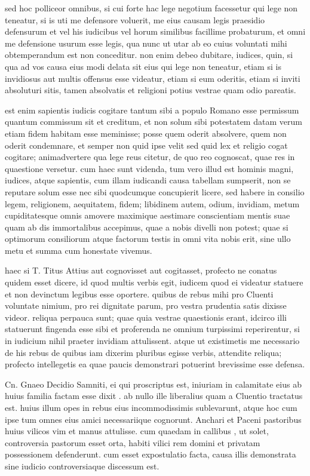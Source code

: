  sed hoc polliceor omnibus, si cui forte hac lege negotium facessetur qui lege non teneatur, si is uti me defensore voluerit, me eius causam legis praesidio defensurum et vel his iudicibus vel horum similibus facillime probaturum, et omni me defensione usurum esse legis, qua nunc ut utar ab eo cuius voluntati mihi obtemperandum est non conceditur. non enim debeo dubitare, iudices, quin, si qua ad vos causa eius modi delata sit eius qui lege non teneatur, etiam si is invidiosus aut multis offensus esse videatur, etiam si eum oderitis, etiam si inviti absoluturi sitis, tamen absolvatis et religioni potius vestrae quam odio pareatis.

 est enim sapientis iudicis cogitare tantum sibi a populo Romano esse permissum quantum commissum sit et creditum, et non solum sibi potestatem datam verum etiam fidem habitam esse meminisse; posse quem oderit absolvere, quem non oderit condemnare, et semper non quid ipse velit sed quid lex et religio cogat cogitare; animadvertere qua lege reus citetur, de quo reo cognoscat, quae res in quaestione versetur. cum haec sunt videnda, tum vero illud est hominis magni, iudices, atque sapientis, cum illam iudicandi causa tabellam sumpserit, non se reputare solum esse nec sibi quodcumque concupierit licere, sed habere in consilio legem, religionem, aequitatem, fidem; libidinem autem, odium, invidiam, metum cupiditatesque omnis amovere maximique aestimare conscientiam mentis suae quam ab dis immortalibus accepimus, quae a nobis divelli non potest; quae si optimorum consiliorum atque factorum testis in omni vita nobis erit, sine ullo metu et summa cum honestate vivemus.

 haec si T. Titus Attius aut cognovisset aut cogitasset, profecto ne conatus quidem esset dicere, id quod multis verbis egit, iudicem quod ei videatur statuere et non devinctum legibus esse oportere. quibus de rebus mihi pro Cluenti voluntate nimium, pro rei dignitate parum, pro vestra prudentia satis dixisse videor. reliqua perpauca sunt; quae quia vestrae quaestionis erant, idcirco illi statuerunt fingenda esse sibi et proferenda ne omnium turpissimi reperirentur, si in iudicium nihil praeter invidiam attulissent. atque ut existimetis me necessario de his rebus de quibus iam dixerim pluribus egisse verbis, attendite reliqua; profecto intellegetis ea quae paucis demonstrari potuerint brevissime esse defensa.

 Cn. Gnaeo Decidio Samniti, ei qui proscriptus est, iniuriam in calamitate eius ab huius familia factam esse dixit . ab nullo ille liberalius quam a Cluentio tractatus est. huius illum opes in rebus eius incommodissimis sublevarunt, atque hoc cum ipse tum omnes eius amici necessariique cognorunt. Anchari et Paceni pastoribus huius vilicos vim et manus attulisse. cum quaedam in callibus , ut solet, controversia pastorum esset orta, habiti vilici rem domini et privatam possessionem defenderunt. cum esset expostulatio facta, causa illis demonstrata sine iudicio controversiaque discessum est.

